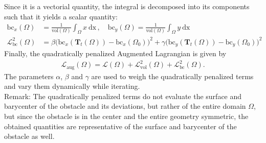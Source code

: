 Since it is a vectorial quantity, the integral is decomposed into its components such that it yields a scalar quantity:
\begin{align}
    \mathrm{bc}_x(\Omega) &=
    \frac{1}{\mathrm{vol}(\Omega)}\int_{\Omega} x \ \mathrm{dx} \, , \quad 
    \mathrm{bc}_y(\Omega) =
    \frac{1}{\mathrm{vol}(\Omega)}\int_{\Omega} y \ \mathrm{dx} \label{bc_equation}\\
	\mathcal{L}^2_{\mathrm{bc}}(\Omega) &= \beta \Big( \mathrm{bc}_x( \mathbf{T}_{t}(\Omega) )-\mathrm{bc}_x(\Omega_0) \Big)^2 + 
	\gamma\Big( \mathrm{bc}_y( \mathbf{T}_{t}(\Omega) )-\mathrm{bc}_y(\Omega_0) \Big)^2
\end{align}
Finally, the quadratically penalized Augmented Lagrangian is given by
\begin{align}\label{final_aug_lagrange}
	\mathcal{L}_{\mathrm{aug}}(\Omega) =  \mathcal{L}(\Omega) + \mathcal{L}^2_{\mathrm{vol}}(\Omega) + \mathcal{L}^2_{\mathrm{bc}}(\Omega).
\end{align}
The parameters $\alpha$, $\beta$ and $\gamma$ are used to weigh the quadratically penalized terms and vary them dynamically while
iterating. \\

Remark: The quadratically penalized terms do not evaluate the surface and barycenter of the obstacle and its deviations, but rather
of the entire domain $\Omega$, but since the obstacle is in the center and the entire geometry symmetric, the obtained quantities are representative of
the surface and barycenter of the obstacle as well.



